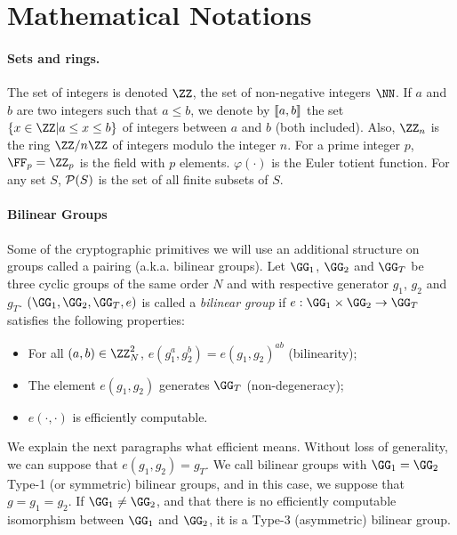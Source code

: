 
\section{Mathematical Notations} %
\label{sec:math_notations}

\paragraph{Sets and rings.} %
\label{par:def_sets_rings}

The set of integers is denoted $\ZZ$, the set of non-negative integers $\NN$.
If $a$ and $b$ are two integers such that $a \leq b$, we denote by $\left\llbracket a,b \right\rrbracket$ the set $\{x \in \ZZ | a \leq x \leq b\}$ of integers between $a$ and $b$ (both included).
Also, $\ZZ_n$ is the ring $\ZZ/n \ZZ$ of integers modulo the integer $n$.
For a prime integer $p$, $\FF_p = \ZZ_p$ is the field with $p$ elements.
$\varphi(\cdot)$ is the Euler totient function.
For any set $S$, $\mathcal{P}(S)$ is the set of all finite subsets of $S$.

\paragraph{Bilinear Groups} %
\label{par:def_bilinear_groups}

Some of the cryptographic primitives we will use an additional structure on groups called a pairing (a.k.a. bilinear groups).
Let $\GG_1$, $\GG_2$ and $\GG_T$ be three cyclic groups of the same order $N$ and with respective generator $g_1$, $g_2$ and $g_T$.
$(\GG_1, \GG_2, \GG_T, e)$ is called a \emph{bilinear group} if $e : \GG_1 \times \GG_2 \rightarrow \GG_T$ satisfies the following properties:
\begin{itemize}
	\item For all $(a,b) \in \ZZ^2_N$, $e(g_1^a, g_2^b) = e(g_1,g_2)^{a b}$ (bilinearity);
	\item The element $e(g_1,g_2)$ generates $\GG_T$ (non-degeneracy);
	\item $e(\cdot,\cdot)$ is efficiently computable.
\end{itemize}
We explain the next paragraphs what efficient means.
Without loss of generality, we can suppose that $e(g_1,g_2) = g_T$.
We call bilinear groups with $\GG_1 = \GG_2$ Type-1 (or symmetric) bilinear groups, and in this case, we suppose that $g = g_1 = g_2$.
If $\GG_1 \neq \GG_2$, and that there is no efficiently computable isomorphism between $\GG_1$ and $\GG_2$, it is a Type-3 (asymmetric) bilinear group.

